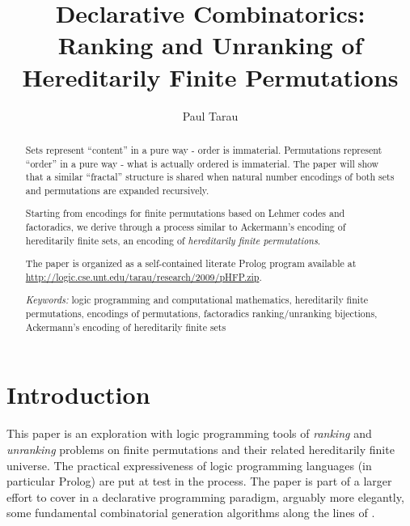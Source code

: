 \documentclass[]{INCLUDES/llncs}
\begin{document}
\title{
  Declarative Combinatorics: Ranking and Unranking of Hereditarily Finite
  Permutations }

\author{Paul Tarau}
\maketitle
\date{}

\begin{abstract}
Sets represent ``content'' in a pure way - order is immaterial. Permutations
represent ``order'' in a pure way - what is actually ordered is immaterial.
The paper will show that a similar ``fractal'' structure is shared when natural
number encodings of both sets and permutations are expanded recursively.

Starting from encodings for finite permutations 
based on Lehmer codes and factoradics, we derive through a 
process similar to Ackermann's encoding of
hereditarily finite sets, an encoding of 
{\em hereditarily finite permutations}.

The paper is organized as a self-contained literate Prolog program  available 
at \url{http://logic.cse.unt.edu/tarau/research/2009/pHFP.zip}.

{\em Keywords:}
logic programming and computational mathematics,
hereditarily finite permutations, 
encodings of permutations, factoradics
ranking/unranking bijections,
Ackermann's encoding of hereditarily finite sets

\end{abstract}

\section{Introduction}

This paper is an exploration with logic programming tools of {\em ranking} and
{\em unranking} problems on finite permutations and their related
hereditarily finite universe. The practical expressiveness of logic programming
languages (in particular Prolog) are put at test in the process. The paper is part
of a larger effort to cover in a declarative programming 
paradigm, arguably more elegantly, some fundamental combinatorial generation 
algorithms along the lines of \cite{knuth06draft}.
\end{document}

